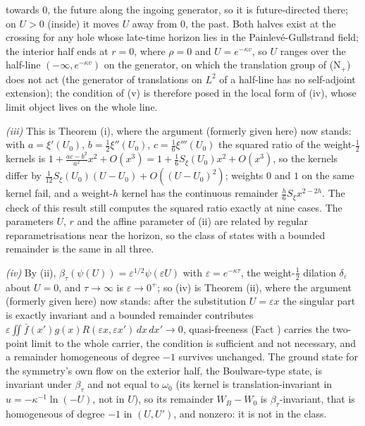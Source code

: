 towards $0$, the future along the ingoing generator, so it is future-directed there; on $U > 0$ (inside) it moves $U$ away from $0$, the past. Both halves exist at the crossing for any hole whose late-time horizon lies in the Painlev\'e-Gullstrand field; the interior half ends at $r = 0$, where $\rho = 0$ and $U = e^{-\kappa v}$, so $U$ ranges over the half-line $(-\infty, e^{-\kappa v})$ on the generator, on which the translation group of (N$_{+}$) does not act (the generator of translations on $L^{2}$ of a half-line has no self-adjoint extension); the condition of (v) is therefore posed in the local form of (iv), whose limit object lives on the whole line.

\emph{(iii)} This is Theorem (i), where the argument (formerly given here) now stands: with $a = \xi'(U_{0})$, $b = \tfrac12\xi''(U_{0})$, $c = \tfrac16\xi'''(U_{0})$ the squared ratio of the weight-$\tfrac12$ kernels is $1 + \tfrac{ac - b^{2}}{a^{2}}x^{2} + O(x^{3}) = 1 + \tfrac16 S_{\xi}(U_{0})x^{2} + O(x^{3})$, so the kernels differ by $\tfrac{1}{12}S_{\xi}(U_{0})(U - U_{0}) + O((U - U_{0})^{2})$; weights $0$ and $1$ on the same kernel fail, and a weight-$h$ kernel has the continuous remainder $\tfrac{h}{6}S_{\xi}x^{2 - 2h}$. The check of this result still computes the squared ratio exactly at nine cases. The parameters $U$, $r$ and the affine parameter of (ii) are related by regular reparametrisations near the horizon, so the class of states with a bounded remainder is the same in all three.

\emph{(iv)} By (ii), $\beta_{\tau}(\psi(U)) = \varepsilon^{1/2}\psi(\varepsilon U)$ with $\varepsilon = e^{-\kappa\tau}$, the weight-$\tfrac12$ dilation $\delta_{\varepsilon}$ about $U = 0$, and $\tau \to \infty$ is $\varepsilon \to 0^{+}$; so (iv) is Theorem (ii), where the argument (formerly given here) now stands: after the substitution $U = \varepsilon x$ the singular part is exactly invariant and a bounded remainder contributes $\varepsilon\iint\bar f(x')g(x)R(\varepsilon x, \varepsilon x')\,dx\,dx' \to 0$, quasi-freeness (Fact ) carries the two-point limit to the whole carrier, the condition is sufficient and not necessary, and a remainder homogeneous of degree $-1$ survives unchanged. The ground state for the symmetry's own flow on the exterior half, the Boulware-type state, is invariant under $\beta_{\tau}$ and not equal to $\omega_{0}$ (its kernel is translation-invariant in $u = -\kappa^{-1}\ln(-U)$, not in $U$), so its remainder $W_{B} - W_{0}$ is $\beta_{\tau}$-invariant, that is homogeneous of degree $-1$ in $(U, U')$, and nonzero: it is not in the class.

